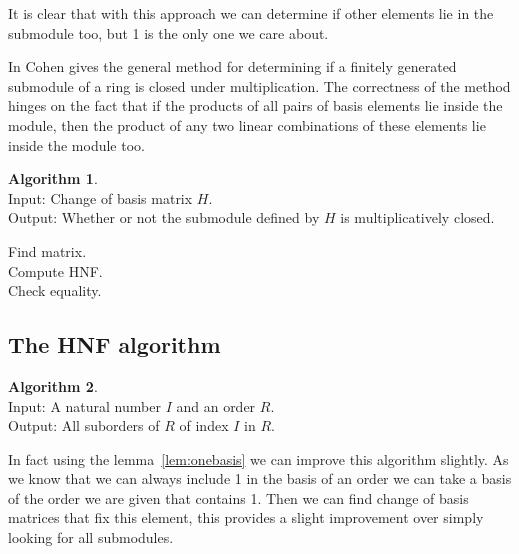 \documentclass[12pt,a4paper,abstracton,bibtotoc]{scrreprt}
\theoremstyle{definition}
\newtheorem{alg}{Algorithm}
\begin{document}
It is clear that with this approach we can determine if other elements lie in the submodule too, but 1 is the only one we care about.

In \cite{cohen93} Cohen gives the general method for determining if a finitely generated submodule of a ring is closed under multiplication.
The correctness of the method hinges on the fact that if the products of all pairs of basis elements lie inside the module, then the product of any two linear combinations of these elements lie inside the module too.

\begin{alg}
\label{alg:multclose}~\\
Input: Change of basis matrix $H$.\\
Output: Whether or not the submodule defined by $H$ is multiplicatively closed.\\
\begin{algorithm}[H]
Find matrix.\\
Compute HNF.\\
Check equality.\\
\end{algorithm}
\end{alg} 

\subsection{The HNF algorithm}
\begin{alg}~\\
Input: A natural number $I$ and an order $R$.\\
Output: All suborders of $R$ of index $I$ in $R$.\\
\begin{algorithm}[H]
\end{algorithm}
\end{alg}

In fact using the lemma~\ref{lem:onebasis} we can improve this algorithm slightly.
As we know that we can always include 1 in the basis of an order we can take a basis of the order we are given that contains 1.
Then we can find change of basis matrices that fix this element, this provides a slight improvement over simply looking for all submodules.
\end{document}
